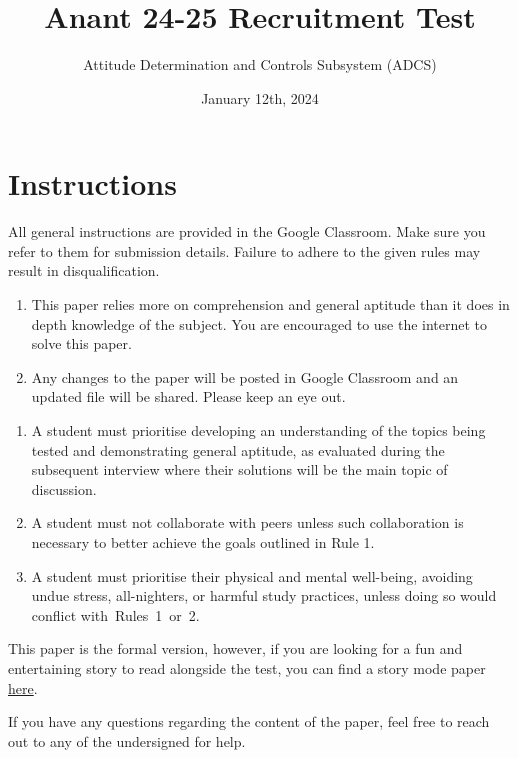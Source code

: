 \documentclass[a4paper, 12pt]{exam}
\begin{document}
	\title{Anant 24-25 Recruitment Test}
	\author{Attitude Determination and Controls Subsystem (ADCS)}
	\date{January 12th, 2024}
	\maketitle
	
	\section*{Instructions}
	All general instructions are provided in the Google Classroom. Make sure you refer to them for submission details. Failure to adhere to the given rules may result in disqualification. 
	\begin{enumerate}[]
		\item This paper relies more on comprehension and general aptitude than it does in depth knowledge of the subject. You are encouraged to use the internet to solve this paper.
		\item Any changes to the paper will be posted in Google Classroom and an updated file will be shared. Please keep an eye out.
	\end{enumerate} 

	\begin{enumerate}[label = \textbf{Rule \arabic* }:, leftmargin=5em]
		\item A student must prioritise developing an understanding of the topics being tested and demonstrating general aptitude, as evaluated during the subsequent interview where their solutions will be the main topic of discussion.
		
		\item A student must not collaborate with peers unless such collaboration is necessary to better achieve the goals outlined in Rule 1.
		
		\item A student must prioritise their physical and mental well-being, avoiding undue stress, all-nighters, or harmful study practices, unless doing so would conflict with Rules 1 or 2.
		
			\end{enumerate}
		
		This paper is the formal version, however, if you are looking for a fun and entertaining story to read alongside the test, you can find a story mode paper \href{https://drive.google.com/file/d/1SEJqstorVU6Evg_eAGXk8d1RSLVlHA_I/view?usp=sharing}{here}.	
		
If you have any questions regarding the content of the paper, feel free to reach out to any of the undersigned for help. \\
\end{document}
